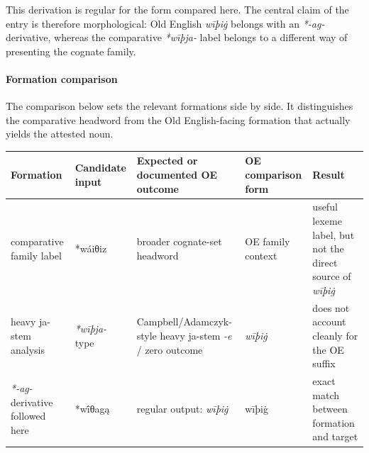 \documentclass[
  british,
  a4paper,
]{article}
\newcounter{none} %
\begin{document}
This derivation is regular for the form compared here. The central claim
of the entry is therefore morphological: Old English \emph{wīþiġ}
belongs with an \emph{*-ag-} derivative, whereas the comparative
\emph{*wīþja-} label belongs to a different way of presenting the
cognate family.

\paragraph{Formation comparison}\label{formation-comparison-8}

The comparison below sets the relevant formations side by side. It
distinguishes the comparative headword from the Old English-facing
formation that actually yields the attested noun.

{\def\LTcaptype{none} %
\begin{longtable}[]{@{}
  >{\raggedright\arraybackslash}p{}
  >{\raggedright\arraybackslash}p{}
  >{\raggedright\arraybackslash}p{}
  >{\raggedright\arraybackslash}p{}
  >{\raggedright\arraybackslash}p{}@{}}
\toprule\noalign{}
\begin{minipage}[b]{\linewidth}\raggedright
Formation
\end{minipage} & \begin{minipage}[b]{\linewidth}\raggedright
Candidate input
\end{minipage} & \begin{minipage}[b]{\linewidth}\raggedright
Expected or documented OE outcome
\end{minipage} & \begin{minipage}[b]{\linewidth}\raggedright
OE comparison form
\end{minipage} & \begin{minipage}[b]{\linewidth}\raggedright
Result
\end{minipage} \\
\midrule\noalign{}
\endhead
\bottomrule\noalign{}
\endlastfoot
comparative family label & *wáiθiz & broader cognate-set headword & OE
family context & useful lexeme label, but not the direct source of
\emph{wīþiġ} \\
heavy ja-stem analysis & \emph{*wīþja-} type & Campbell/Adamczyk-style
heavy ja-stem \emph{-e} / zero outcome & \emph{wīþiġ} & does not account
cleanly for the OE suffix \\
\emph{*-ag-} derivative followed here & *wī́θagą & regular output:
\emph{wīþiġ} & wīþiġ & exact match between formation and target \\
\end{longtable}
}
\end{document}
